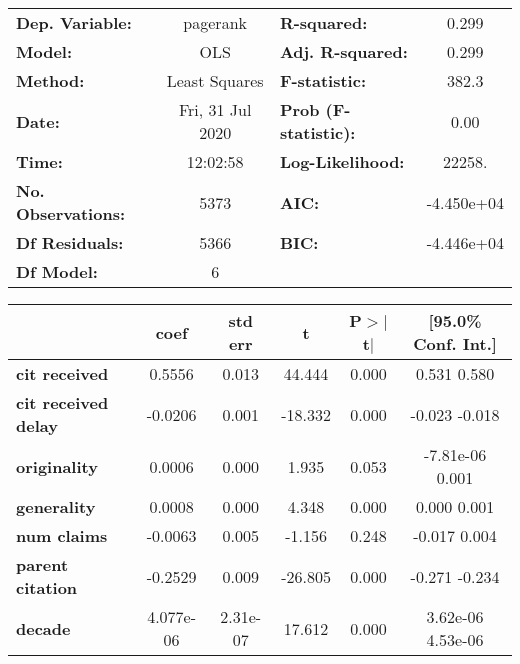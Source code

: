 \begin{center}
\begin{tabular}{lclc}
\toprule
\textbf{Dep. Variable:}     &     pagerank     & \textbf{  R-squared:         } &      0.299    \\
\textbf{Model:}             &       OLS        & \textbf{  Adj. R-squared:    } &      0.299    \\
\textbf{Method:}            &  Least Squares   & \textbf{  F-statistic:       } &      382.3    \\
\textbf{Date:}              & Fri, 31 Jul 2020 & \textbf{  Prob (F-statistic):} &      0.00     \\
\textbf{Time:}              &     12:02:58     & \textbf{  Log-Likelihood:    } &     22258.    \\
\textbf{No. Observations:}  &        5373      & \textbf{  AIC:               } &  -4.450e+04   \\
\textbf{Df Residuals:}      &        5366      & \textbf{  BIC:               } &  -4.446e+04   \\
\textbf{Df Model:}          &           6      & \textbf{                     } &               \\
\bottomrule
\end{tabular}
\begin{tabular}{lccccc}
                            & \textbf{coef} & \textbf{std err} & \textbf{t} & \textbf{P$>$$|$t$|$} & \textbf{[95.0\% Conf. Int.]}  \\
\midrule
\textbf{cit received}       &       0.5556  &        0.013     &    44.444  &         0.000        &         0.531     0.580       \\
\textbf{cit received delay} &      -0.0206  &        0.001     &   -18.332  &         0.000        &        -0.023    -0.018       \\
\textbf{originality}        &       0.0006  &        0.000     &     1.935  &         0.053        &     -7.81e-06     0.001       \\
\textbf{generality}         &       0.0008  &        0.000     &     4.348  &         0.000        &         0.000     0.001       \\
\textbf{num claims}         &      -0.0063  &        0.005     &    -1.156  &         0.248        &        -0.017     0.004       \\
\textbf{parent citation}    &      -0.2529  &        0.009     &   -26.805  &         0.000        &        -0.271    -0.234       \\
\textbf{decade}             &    4.077e-06  &     2.31e-07     &    17.612  &         0.000        &      3.62e-06  4.53e-06       \\

\end{tabular}
\end{center}
